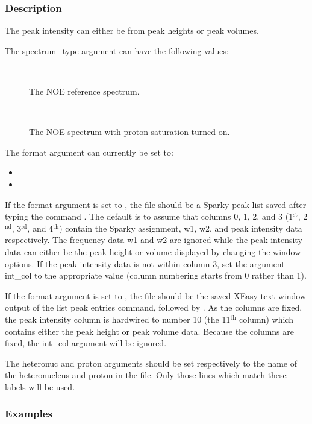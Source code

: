 \subsubsection{Description}

The peak intensity can either be from peak heights or peak volumes.


The spectrum\_type argument can have the following values:
\begin{description}
\item[    
 --]   The NOE reference spectrum.
\item[    
 --]   The NOE spectrum with proton saturation turned on.
\end{description}


The format argument can currently be set to:
\begin{itemize}
\item[]     
\item[]     
\end{itemize}

If the format argument is set to 
, the file should be a Sparky peak list saved after
typing the command 
.  The default is to assume that columns 0, 1, 2, and 3 (1$^\mathrm{st}$, 2$^\mathrm{nd}$,
3$^\mathrm{rd}$, and 4$^\mathrm{th}$) contain the Sparky assignment, w1, w2, and peak intensity data respectively.
The frequency data w1 and w2 are ignored while the peak intensity data can either be the
peak height or volume displayed by changing the window options.  If the peak intensity data
is not within column 3, set the argument int\_col to the appropriate value (column numbering
starts from 0 rather than 1).

If the format argument is set to 
, the file should be the saved XEasy text window
output of the list peak entries command, 
 followed by 
.  As the columns are fixed,
the peak intensity column is hardwired to number 10 (the 11$^\mathrm{th}$ column) which contains either
the peak height or peak volume data.  Because the columns are fixed, the int\_col argument
will be ignored.


The heteronuc and proton arguments should be set respectively to the name of the
heteronucleus and proton in the file.  Only those lines which match these labels will be
used.


\subsubsection{Examples}

